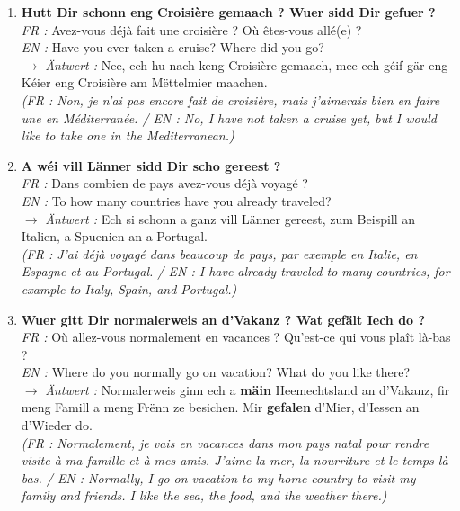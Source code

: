 \begin{enumerate}
    \item \textbf{Hutt Dir schonn eng Croisière gemaach ? Wuer sidd Dir gefuer ?} \\
    \textit{FR :} Avez-vous déjà fait une croisière ? Où êtes-vous allé(e) ? \\
    \textit{EN :} Have you ever taken a cruise? Where did you go? \\
    $\rightarrow$ \textit{Äntwert :} Nee, ech hu nach keng Croisière gemaach, mee ech géif gär eng Kéier eng Croisière am Mëttelmier maachen. \\
    \textit{\small(FR : Non, je n'ai pas encore fait de croisière, mais j'aimerais bien en faire une en Méditerranée. / EN : No, I have not taken a cruise yet, but I would like to take one in the Mediterranean.)}

    \vspace{0.3em}

    \item \textbf{A wéi vill Länner sidd Dir scho gereest ?} \\
    \textit{FR :} Dans combien de pays avez-vous déjà voyagé ? \\
    \textit{EN :} To how many countries have you already traveled? \\
    $\rightarrow$ \textit{Äntwert :} Ech si schonn a ganz vill Länner gereest, zum Beispill an Italien, a Spuenien an a Portugal. \\
    \textit{\small(FR : J'ai déjà voyagé dans beaucoup de pays, par exemple en Italie, en Espagne et au Portugal. / EN : I have already traveled to many countries, for example to Italy, Spain, and Portugal.)}

    \vspace{0.3em}

    \item \textbf{Wuer gitt Dir normalerweis an d'Vakanz ? Wat gefält Iech do ?} \\
    \textit{FR :} Où allez-vous normalement en vacances ? Qu'est-ce qui vous plaît là-bas ? \\
    \textit{EN :} Where do you normally go on vacation? What do you like there? \\
    $\rightarrow$ \textit{Äntwert :} Normalerweis ginn ech a \textbf{mäin} Heemechtsland an d'Vakanz, fir meng Famill a meng Frënn ze besichen. Mir \textbf{gefalen} d'Mier, d'Iessen an d'Wieder do. \\
    \textit{\small(FR : Normalement, je vais en vacances dans mon pays natal pour rendre visite à ma famille et à mes amis. J'aime la mer, la nourriture et le temps là-bas. / EN : Normally, I go on vacation to my home country to visit my family and friends. I like the sea, the food, and the weather there.)}


\end{enumerate}
